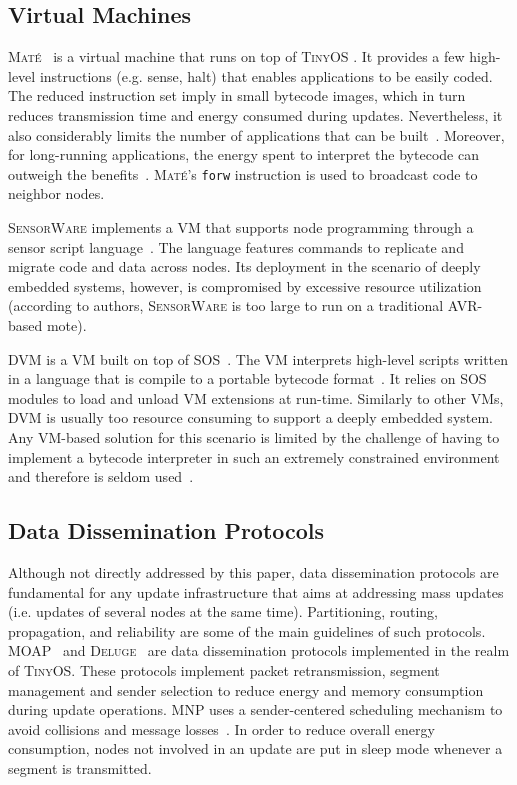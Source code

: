 \documentclass[10pt]{sigplanconf}
\begin{document}
\subsection{Virtual Machines}

\textsc{Mat\'{e}}~\cite{mate} is a virtual machine that runs on top of
\textsc{TinyOS} \cite{hill00system}. It provides a few high-level
instructions (e.g. sense, halt) that enables applications to
be easily coded. The reduced instruction set imply in small
bytecode images, which in turn reduces transmission time and energy
consumed during updates. Nevertheless, it also considerably limits the
number of applications that can be built~\cite{sensorware}. Moreover,
for long-running applications, the energy spent to interpret the
bytecode can outweigh the benefits~\cite{mate}. \textsc{Mat\'{e}}'s
\texttt{forw} instruction is used to broadcast code to neighbor nodes.

\textsc{SensorWare} implements a VM that supports node programming
through a sensor script language~\cite{sensorware}. The language
features commands to replicate and migrate code and data across nodes.
Its deployment in the scenario of deeply embedded systems, however, is
compromised by excessive resource utilization (according to authors,
\textsc{SensorWare} is too large to run on a traditional AVR-based mote). 

\textsc{DVM} is a VM built on top of \textsc{SOS}~\cite{sos}. The VM
interprets high-level scripts written in a language that is compile to
a portable bytecode format~\cite{multi-level}.  It relies on
\textsc{SOS} modules to load and unload VM extensions at run-time.
Similarly to other VMs, \textsc{DVM} is usually too resource consuming
to support a deeply embedded system. Any VM-based solution
for this scenario is limited by the challenge of having to implement a
bytecode interpreter in such an extremely constrained environment and
therefore is seldom used~\cite{koshy}.

\subsection{Data Dissemination Protocols}

Although not directly addressed by this paper, data dissemination
protocols are fundamental for any update infrastructure that aims at
addressing mass updates (i.e. updates of several nodes at the same
time).  Partitioning, routing, propagation, and reliability are some
of the main guidelines of such protocols. \textsc{MOAP}~\cite{stathopoulos03remote} and
\textsc{Deluge}~\cite{deluge} are data dissemination protocols
implemented in the realm of \textsc{TinyOS}. These protocols implement
packet retransmission, segment management and sender selection to
reduce energy and memory consumption during update operations.
\textsc{MNP} uses a sender-centered scheduling mechanism to avoid
collisions and message losses~\cite{mnp}. In order to reduce overall
energy consumption, nodes not involved in an update are put in sleep
mode whenever a segment is transmitted. 
\end{document}
